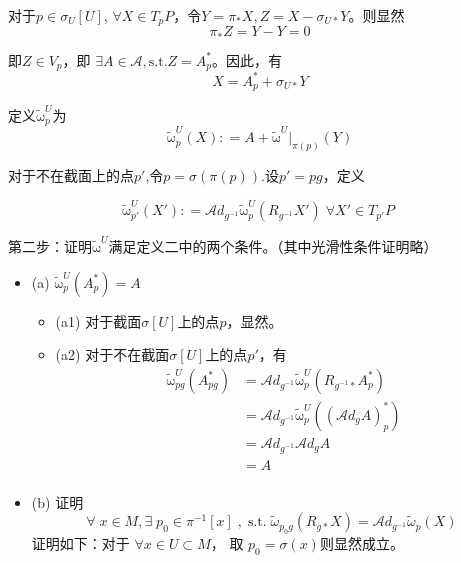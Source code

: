 \documentclass{ctexbook}
\begin{document}
对于$p\in\sigma_U[U]$, $\forall X\in T_p P$，令$Y=\pi_{*}X,Z=X-\sigma_{U*}Y$。则显然
\begin{equation}
    \pi_{*}Z=Y-Y=0
\end{equation}

即$Z\in V_p$，即 $\exists A\in\mathscr{A},\text{s.t.}Z=A_p^{*}$。因此，有
\begin{equation}
    X=A_{p}^{*}+\sigma_{U*}Y
\end{equation}

定义$\tilde{\mathrm{\omega}}^{U}_p$为
\begin{equation}
    \tilde{\mathrm{\omega}}^{U}_p(X)\colon =A+\tilde{\mathrm{\omega}}^{U}|_{\pi(p)}(Y)
\end{equation}

对于不在截面上的点$p'$,令$p=\sigma(\pi(p))$.设$p'=pg$，定义

\begin{equation}
    \tilde{\mathrm{\omega}}^{U}_{p'}(X')\colon =\mathscr{A}d_{g^{-1}}\tilde{\mathrm{\omega}}^{U}_p(R_{g^{-1}}X')\;\forall X'\in T_{p'}P\;
\end{equation}

第二步：证明$\tilde{\mathrm{\omega}}^{U}$满足定义二中的两个条件。（其中光滑性条件证明略）

\begin{itemize}
    \item (a) $\tilde{\mathrm{\omega}}^{U}_{p}(A^{*}_p)=A$
    \begin{itemize}
        \item (a1) 对于截面$\sigma[U]$上的点$p$，显然。
        \item (a2) 对于不在截面$\sigma[U]$上的点$p'$，有
        \begin{equation}
            \begin{split}
               \tilde{\mathrm{\omega}}^{U}_{pg}(A^{*}_{pg})&=\mathscr{A}d_{g^{-1}}\tilde{\mathrm{\omega}}^{U}_{p}(R_{g^{-1}*}A^{*}_p)\\
               &=\mathscr{A}d_{g^{-1}}\tilde{\mathrm{\omega}}^{U}_{p}\left((\mathscr{A}d_{g}A)^{*}_{p}\right)\\
               &=\mathscr{A}d_{g^{-1}}\mathscr{A}d_{g}A\\
               &=A\\
            \end{split}
        \end{equation}
    \end{itemize}
    \item (b) 证明
        \begin{equation}
            \forall\;x\in M,\exists\;p_0\in\pi^{-1}[x]\;,\; \text{s.t.}\;
            \tilde{\mathscr{\omega}}_{p_0g}(R_{g*}X)=\mathscr{A}
            d_{g^{-1}}\tilde{\mathscr{\omega}}_{p}(X)
        \end{equation}
        证明如下：对于 $\forall x\in U\subset M$， 取 $p_0=\sigma(x)$则显然成立。
\end{itemize}
\end{document}
